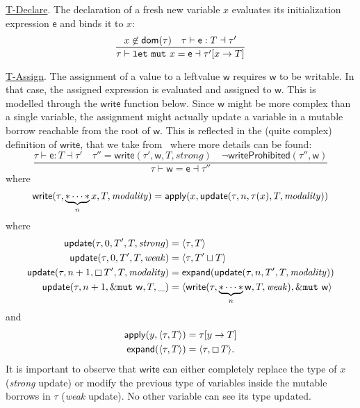 \noindent
\underline{\textsf{T-Declare}}.
The declaration of a fresh new variable $x$ evaluates its initialization expression $\mathsf{e}$ and
binds it to $x$:
\[
\frac
    {x\not\in\mathsf{dom}(\tau)\quad\tau\vdash\mathsf{e}:T\dashv\tau'}
    {\tau\vdash\mathtt{let\ mut}\ x=\mathsf{e}\dashv\tau'[x\to T]}
\]

\noindent
\underline{\textsf{T-Assign}}.
The assignment of a value to a leftvalue $\mathsf{w}$ requires $\mathsf{w}$ to be writable.
In that case, the assigned expression is evaluated and assigned to $\mathsf{w}$.
This is modelled through the $\mathsf{write}$ function below.
Since $\mathsf{w}$ might be more complex than a single variable, the assignment might actually
update a variable in a mutable borrow reachable from the root of $\mathsf{w}$. This is reflected
in the (quite complex) definition of $\mathsf{write}$, that we take from~\cite{Pearce21}
where more details can be found:
\[
\frac
    {\tau\vdash\mathsf{e}:T\dashv\tau' \quad
      \tau''=\mathsf{write}(\tau',\mathsf{w},T,\mathit{strong}) \quad
      \neg\mathsf{writeProhibited}(\tau'',\mathsf{w})}
    {\tau\vdash\mathsf{w}=\mathsf{e}\dashv\tau''}
\]
where
\[
\mathsf{write}(\tau,\underbrace{\mathtt{*}\cdots\mathtt{*}}_nx,T,\mathit{modality})=\mathsf{apply}
(x,\mathsf{update}(\tau,n,\tau(x),T,\mathit{modality}))
\]
%
where
%
\begin{align*}
  \mathsf{update}(\tau,0,T',T,\mathit{strong})&=\langle\tau,T\rangle\\
  \mathsf{update}(\tau,0,T',T,\mathit{weak})&=\langle\tau,T'\sqcup T\rangle\\
  \mathsf{update}(\tau,n+1,\boxempty\,{T'},T,\mathit{modality})
  &=\mathsf{expand}(\mathsf{update}(\tau,n,T',T,\mathit{modality}))\\
  \mathsf{update}(\tau,n+1,\&\mathtt{mut}\ \mathsf{w},T,\_)&=
  \langle\mathsf{write}(\tau,\underbrace{\mathtt{*}\cdots\mathtt{*}}_n\mathsf{w},T,\mathit{weak}),
  \&\mathtt{mut}\ \mathsf{w}\rangle
\end{align*}
and
\begin{align*}
  \mathsf{apply}(y,\langle\tau,T\rangle)&=\tau[y\to T]\\
  \mathsf{expand}(\langle\tau,T\rangle)&=\langle\tau,\boxempty\,{T}\rangle.
\end{align*}
%
\noindent
It is important to observe that $\mathsf{write}$
can either completely replace the type of $x$
(\emph{strong} update) or modify the previous type of variables
inside the mutable borrows in $\tau$ (\emph{weak} update).
No other variable can see its type updated.

